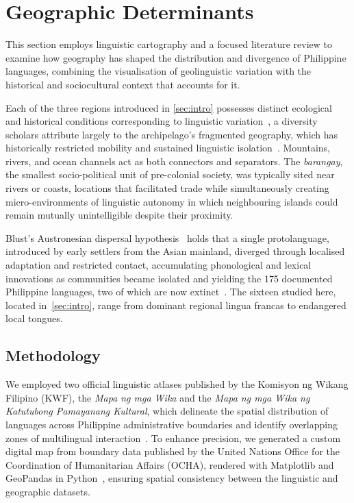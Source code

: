 \section{Geographic Determinants}\label{sec:geo}

This section employs linguistic cartography and a focused literature review to
examine how geography has shaped the distribution and divergence of Philippine
languages, combining the visualisation of geolinguistic variation with the
historical and sociocultural context that accounts for it.

Each of the three regions introduced in \cref{sec:intro} possesses distinct
ecological and historical conditions corresponding to linguistic
variation~\cite{Boquet_2017}, a diversity scholars attribute largely to the
archipelago's fragmented geography, which has historically restricted mobility
and sustained linguistic isolation~\cite{Blust_1991}. Mountains, rivers, and
ocean channels act as both connectors and separators. The \emph{barangay}, the
smallest socio-political unit of pre-colonial society, was typically sited near
rivers or coasts, locations that facilitated trade while simultaneously creating
micro-environments of linguistic autonomy in which neighbouring islands could
remain mutually unintelligible despite their proximity.

Blust's Austronesian dispersal hypothesis~\cite{Blust_1991} holds that a single
protolanguage, introduced by early settlers from the Asian mainland, diverged
through localised adaptation and restricted contact, accumulating phonological
and lexical innovations as communities became isolated and yielding the 175
documented Philippine languages, two of which are now
extinct~\cite{ethnologue2025}. The sixteen studied here, located
in~\cref{sec:intro}, range from dominant regional lingua francas to endangered
local tongues.

\subsection{Methodology}

We employed two official linguistic atlases published by the Komisyon ng Wikang
Filipino (KWF), the \emph{Mapa ng mga Wika} and the \emph{Mapa ng mga Wika ng
Katutubong Pamayanang Kultural}, which delineate the spatial distribution of
languages across Philippine administrative boundaries and identify overlapping
zones of multilingual interaction~\cite{Marrion2025MapaKultural,
    KWF2025MapaPilipinas}. To enhance precision, we generated a custom digital map
from boundary data published by the United Nations Office for the Coordination of
Humanitarian Affairs (OCHA), rendered with Matplotlib and GeoPandas in
Python~\cite{OCHA_Philippines_2018_PHL_Admin_Boundaries, Hunter:2007,
    kelsey_jordahl_2020_3946761}, ensuring spatial consistency between the
linguistic and geographic datasets.

